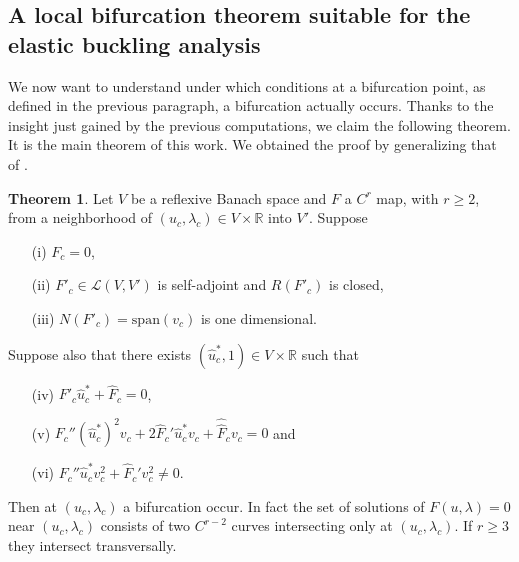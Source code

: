 \documentclass[a4paper,11pt]{article}
\theoremstyle{definition}
\newtheorem{thm}[prop]{Theorem}
\begin{document}
\subsection{A local bifurcation theorem suitable for the elastic buckling analysis}

We now want to understand under which conditions at a bifurcation point, as defined in the previous paragraph, a bifurcation actually occurs. Thanks to the insight just gained by the previous computations, we claim the following theorem. It is the main theorem of this work. We obtained the proof by generalizing that of \cite[Theorem 3.3.3]{niremberg}.

\begin{thm}
\label{thm:main}
Let $V$ be a reflexive Banach space and $F$ a $C^r$ map, with $r\ge2$, from a neighborhood of $(u_c,\lambda_c)\in V\times\mathbb{R}$ into $V'$. Suppose
\begin{itemize}
\item[(i)] $F_c=0$,
\item[(ii)] $F'_c\in\mathscr{L}(V,V')$ is self-adjoint and $R(F'_c)$ is closed,
\item[(iii)] $N(F'_c)=\text{span}(v_c)$ is one dimensional.
\end{itemize}
Suppose also that there exists $(\hat{u}^*_c,1)\in V\times\mathbb{R}$ such that
\begin{itemize}
\item[(iv)] $F'_c\hat{u}^*_c+\hat{F}_c=0$,
\item[(v)] $F_c''(\hat{u}_c^*)^2v_c+2\hat{F}_c'\hat{u}_c^*v_c+\hat{\hat{F}}_cv_c=0$ and
\item[(vi)] $F_c''\hat{u}_c^*v_c^2+\hat{F}_c'v_c^2\neq0$.
\end{itemize}

Then at $(u_c,\lambda_c)$ a bifurcation occur. In fact the set of solutions of $F(u,\lambda)=0$ near $(u_c,\lambda_c)$ consists of two $C^{r-2}$ curves intersecting only at $(u_c,\lambda_c)$. If $r\ge3$ they intersect transversally.
\end{thm}
\end{document}
